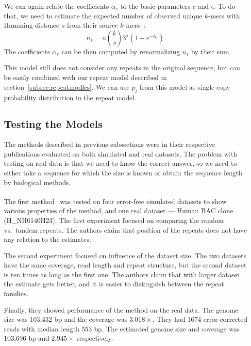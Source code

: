 We can again relate the coefficients $\alpha_s$ to the basic parameters $c$ and $\epsilon$. To do that, we need to estimate the expected number of observed unique $k$-mers with Hamming distance $s$ from their source $k$-mers~\cite{covest}:
$$n_s = n {k \choose s} 3^s (1- e^{-\lambda_s}).$$
The coefficients $\alpha_s$ can be then computed by renormalizing $n_s$ by their sum.

This model still does not consider any repeats in the original sequence, but can be easily combined with our repeat model described in section~\ref{subsec:repeatmodles}. We can use $p_j$ from this model as single-copy probability distribution in the repeat model.

\subsection{Testing the Models}
The methods described in previous subsections were in their respective publications evaluated on both simulated and real datasets. The problem with testing on real data is that we need to know the correct answer, so we need to either take a sequence for which the size is known or obtain the sequence length by biological methods.

\paragraph{}The first method~\cite{waterman} was tested on four error-free simulated datasets to show various properties of the method, and one real dataset --- Human BAC clone (H\_NH0140H23). The first experiment focused on comparing the random vs.\ tandem repeats. The authors claim that position of the repeats does not have any relation to the estimates.

The second experiment focused on influence of the dataset size. The two datasets have the same coverage, read length and repeat structure, but the second dataset is ten times as long as the first one. The authors claim that with larger dataset the estimate gets better, and it is easier to distinguish between the repeat families.

Finally, they showed performance of the method on the real data.
The genome size was 103,432 bp and the coverage was $3.018\times$.
They had 1674 error-corrected reads with median length 553 bp.
The estimated genome size and coverage was 103,696 bp and $2.945\times$ respectively.

